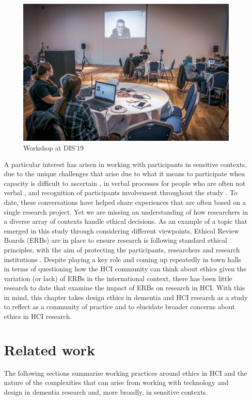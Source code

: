 \begin{figure}[htp]
\centering
\includegraphics[width=.8\linewidth]{Images/DemVR/Howard.jpg}
\caption{Workshop at DIS'19}
\label{fig:EthicsWorkshop}
\end{figure}

A particular interest has arisen in working with participants in sensitive contexts, due to the unique challenges that arise due to what it means to participate when capacity is difficult to ascertain \citep{foley_printer_2019,lazar_using_2014}, in verbal processes for people who are often not verbal \citep{knapp_nonverbal_2013,kontos_integrating_2018,john_killick_claire_craig_creativity_2012}, and recognition of participants involvement throughout the study \citep{wallace_enabling_2012-1,lindsay_empathy_2012,morrissey_creative_2015}. To date, these conversations have helped share experiences that are often based on a single research project. Yet we are missing an understanding of how researchers in a diverse array of contexts handle ethical decisions. As an example of a topic that emerged in this study through considering different viewpoints, Ethical Review Boards (ERBs) are in place to ensure research is following standard ethical principles, with the aim of protecting the participants, researchers and research institutions \citep{flicker_ethical_2007}. Despite playing a key role and coming up repeatedly in town halls in terms of questioning how the HCI community can think about ethics given the variation (or lack) of ERBs in the international context, there has been little research to date that examine the impact of ERBs on research in HCI. With this in mind, this chapter takes design ethics in dementia and HCI research as a study to reflect as a community of practice and to elucidate broader concerns about ethics in HCI research.

\section{Related work}
\label{Ethics:RelatedWork}
The following sections summarise working practices around ethics in HCI and the nature of the complexities that can arise from working with technology and design in dementia research and, more broadly, in sensitive contexts.

